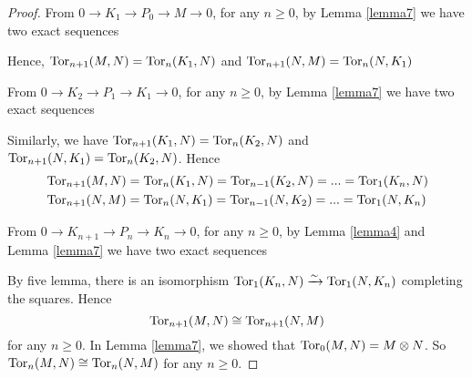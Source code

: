 \begin{proof}
	From $0 \to K_1 \to P_0 \to M \to 0$, for any $n \geq 0$, by Lemma \ref{lemma7} we have two exact sequences
	\begin{center}
	\end{center}
	Hence, $\operatorname{Tor}_{n+1}(M, N) = \operatorname{Tor}_n(K_1, N)$ and $\operatorname{Tor}_{n+1}(N, M) = \operatorname{Tor}_n(N, K_1)$
	
	From $0 \to K_2 \to P_1 \to K_1 \to 0$, for any $n \geq 0$, by Lemma \ref{lemma7} we have two exact sequences
	\begin{center}
	\end{center}
	Similarly, we have $\operatorname{Tor}_{n+1}(K_1, N) = \operatorname{Tor}_n(K_2, N)$ and $\operatorname{Tor}_{n+1}(N, K_1) = \operatorname{Tor}_n(K_2, N)$. Hence
	\begin{align*}
		&\operatorname{Tor}_{n+1}(M, N) = \operatorname{Tor}_n(K_1, N) = \operatorname{Tor}_{n-1}(K_2, N) = ... = \operatorname{Tor}_1(K_n, N) \\
		&\operatorname{Tor}_{n+1}(N, M) = \operatorname{Tor}_n(N, K_1) = \operatorname{Tor}_{n-1}(N, K_2) = ... = \operatorname{Tor}_1(N, K_n)
	\end{align*}
	
	From $0 \to K_{n+1} \to P_n \to K_n \to 0$, for any $n \geq 0$, by Lemma \ref{lemma4} and Lemma \ref{lemma7} we have two exact sequences
	\begin{center}
	\end{center}
	
	By five lemma, there is an isomorphism $\operatorname{Tor}_1(K_n, N) \xrightarrow{\sim} \operatorname{Tor}_1(N, K_n)$ completing the squares. Hence
	$$
		\operatorname{Tor}_{n+1}(M, N) \cong \operatorname{Tor}_{n+1}(N, M)
	$$
	for any $n \geq 0$. In Lemma \ref{lemma7}, we showed that $\operatorname{Tor}_0(M, N) = M \otimes N$. So $\operatorname{Tor}_n(M, N) \cong \operatorname{Tor}_n(N, M)$ for any $n \geq 0$.
\end{proof}

